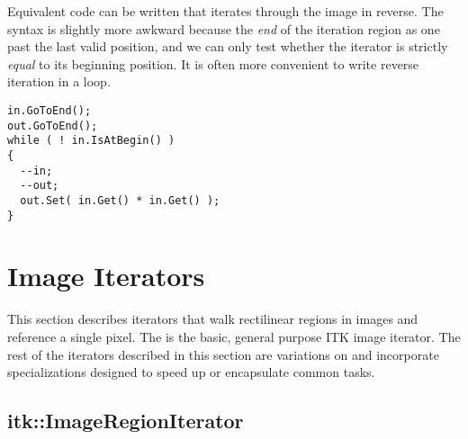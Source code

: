 Equivalent code can be written that iterates through the image in reverse.  The
syntax is slightly more awkward because the \emph{end} of the iteration region
as one past the last valid position, and we can only test whether the iterator
is strictly \emph{equal} to its beginning position.  It is often more
convenient to write reverse iteration in a  loop.

\begin{verbatim}
in.GoToEnd();
out.GoToEnd();
while ( ! in.IsAtBegin() )
{
  --in;
  --out;
  out.Set( in.Get() * in.Get() );
}

\end{verbatim}






\section{Image Iterators}
\label{sec:ImageIterators}
This section describes iterators that walk rectilinear regions in images and
reference a single pixel.  The  is the basic,
general purpose ITK image iterator.  The rest of the
iterators described in this section are variations on
 and incorporate specializations designed to 
speed up or encapsulate common tasks.


\subsection{itk::ImageRegionIterator}
\label{sec:itkImageRegionIterator}


